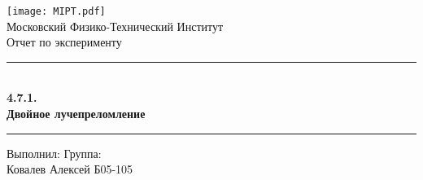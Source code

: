 \documentclass[a4paper,12pt]{scrartcl}
\begin{document}
\begin{titlepage}
        \vspace*{\fill}

        \begin{center}
            \texttt{[image: MIPT.pdf]}
            \\[0.7cm]\Huge Московский Физико-Технический Институт
            \\[2cm]\LARGE Отчет по эксперименту
            \\[0.5cm]\noindent\rule{\textwidth}{1pt}
            \\\Huge\textbf{4.7.1. \\ Двойное лучепреломление}
            \\[-0.5cm]\noindent\rule{\textwidth}{1pt}
        \end{center}

        \vspace*{\fill}

        \begin{flushleft}
            Выполнил: \hspace{\fill} Группа:
            \\Ковалев Алексей \hspace{\fill} Б05-105
        \end{flushleft}
    \end{titlepage}

    \setcounter{page}{2}
\end{document}
